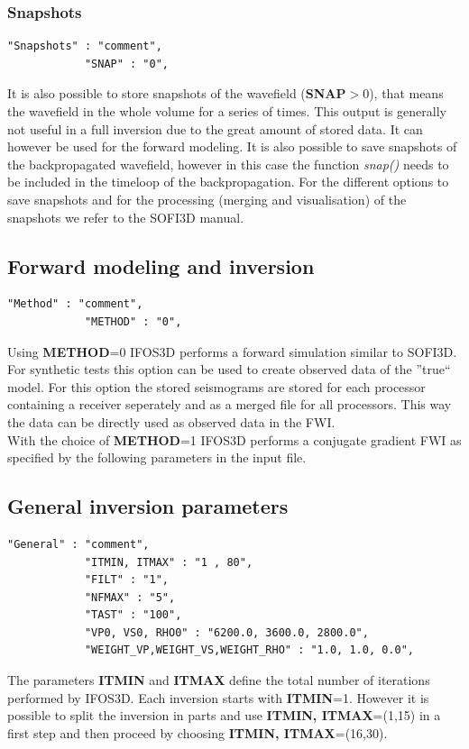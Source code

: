\subsubsection*{Snapshots}
\begin{verbatim}
"Snapshots" : "comment",
			"SNAP" : "0",
\end{verbatim}

It is also possible to store snapshots of the wavefield (\textbf{SNAP}$>$0), that means the wavefield in the whole volume for a series of times. This output is generally not useful in a full inversion due to the great amount of stored data. It can however be used for the forward modeling. It is also possible to save snapshots of the backpropagated wavefield, however in this case the function \textit{snap()} needs to be included in the timeloop of the backpropagation. For the different options to save snapshots and for the processing (merging and visualisation) of the snapshots we refer to the SOFI3D manual.
\subsection{Forward modeling and inversion}
\begin{verbatim}
"Method" : "comment",
			"METHOD" : "0",
\end{verbatim}

Using \textbf{METHOD}=0 IFOS3D performs a forward simulation similar to SOFI3D. For synthetic tests this option can be used to create observed data of the ''true`` model. For this option the stored seismograms are stored for each processor containing a receiver seperately and as a merged file for all processors. This way the data can be directly used as observed data in the FWI.\\
With the choice of \textbf{METHOD}=1 IFOS3D performs a conjugate gradient FWI as specified by the following parameters in the input file.
\subsection{General inversion parameters}
\begin{verbatim}
"General" : "comment",
			"ITMIN, ITMAX" : "1 , 80",
			"FILT" : "1",
			"NFMAX" : "5",
			"TAST" : "100",
			"VP0, VS0, RHO0" : "6200.0, 3600.0, 2800.0",
			"WEIGHT_VP,WEIGHT_VS,WEIGHT_RHO" : "1.0, 1.0, 0.0",
\end{verbatim}

The parameters \textbf{ITMIN} and \textbf{ITMAX} define the total number of iterations performed by IFOS3D. Each inversion starts with \textbf{ITMIN}=1. However it is possible to split the inversion in parts and use \textbf{ITMIN, ITMAX}=(1,15) in a first step and then proceed by choosing \textbf{ITMIN, ITMAX}=(16,30). 
\vspace{0.3cm}\\

